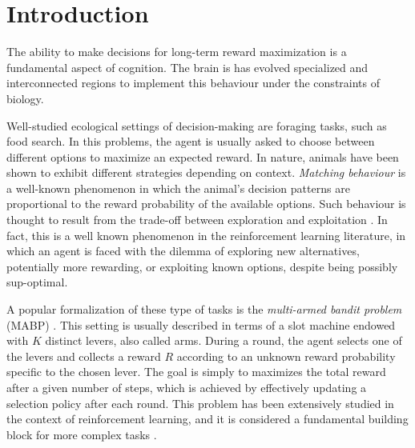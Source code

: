 
\section{Introduction}
\hfill \break
\vspace {0.5cm}

The ability to make decisions for long-term reward maximization is a fundamental aspect of cognition. The brain is has evolved specialized and interconnected regions to implement this behaviour under the constraints of biology.

Well-studied ecological settings of decision-making are foraging tasks, such as food search. In this problems, the agent is usually asked to choose between different options to maximize an expected reward.
In nature, animals have been shown to exhibit different strategies depending on context.
\textit{Matching behaviour} is a well-known phenomenon in which the animal's decision patterns are proportional to the reward probability of the available options.
Such behaviour is thought to result from the trade-off between exploration and exploitation \cite{suttonReinforcementLearningProblem1998, nivEvolutionReinforcementLearning2002}.
In fact, this is a well known phenomenon in the reinforcement learning literature, in which an agent is faced with the dilemma of exploring new alternatives, potentially more rewarding, or exploiting known options, despite being possibly sup-optimal.

A popular formalization of these type of tasks is the \textit{multi-armed bandit problem} (MABP) \cite{averbeckTheoryChoiceBandit2015}. This setting is usually described in terms of a slot machine endowed with $K$ distinct levers, also called arms.
During a round, the agent selects one of the levers and collects a reward $R$ according to an unknown reward probability specific to the chosen lever.
The goal is simply to maximizes the total reward after a given number of steps, which is achieved by effectively updating a selection policy after each round.
This problem has been extensively studied in the context of reinforcement learning, and it is considered a fundamental building block for more complex tasks \cite{suttonReinforcementLearningProblem1998}.

